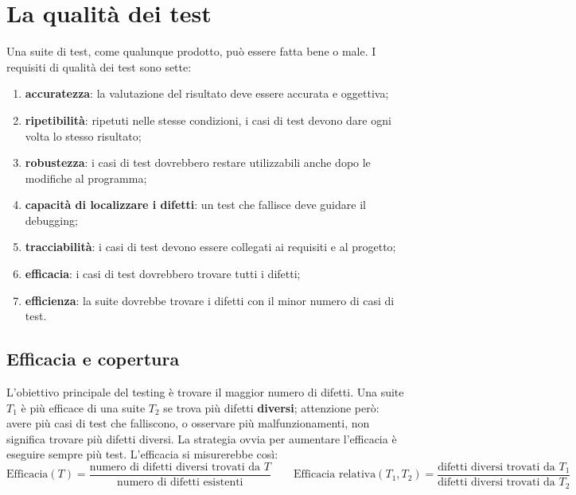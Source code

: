 \section{La qualità dei test}

Una suite di test, come qualunque prodotto, può essere fatta bene o male. I requisiti di qualità dei test sono sette:

\begin{enumerate}
  \item \textbf{accuratezza}: la valutazione del risultato deve essere accurata e oggettiva;
  \item \textbf{ripetibilità}: ripetuti nelle stesse condizioni, i casi di test devono dare ogni volta lo stesso
        risultato;
  \item \textbf{robustezza}: i casi di test dovrebbero restare utilizzabili anche dopo le modifiche al programma;
  \item \textbf{capacità di localizzare i difetti}: un test che fallisce deve guidare il debugging;
  \item \textbf{tracciabilità}: i casi di test devono essere collegati ai requisiti e al progetto;
  \item \textbf{efficacia}: i casi di test dovrebbero trovare tutti i difetti;
  \item \textbf{efficienza}: la suite dovrebbe trovare i difetti con il minor numero di casi di test.
\end{enumerate}

\subsection{Efficacia e copertura}

L'obiettivo principale del testing è trovare il maggior numero di difetti. Una suite \(T_1\) è più efficace di una suite
\(T_2\) se trova più difetti \textbf{diversi}; attenzione però: avere più casi di test che falliscono, o osservare più
malfunzionamenti, non significa trovare più difetti diversi. La strategia ovvia per aumentare l'efficacia è eseguire
sempre più test. L'efficacia si misurerebbe così:
\[
  \text{Efficacia}(T) = \frac{\text{numero di difetti diversi trovati da } T}{\text{numero di difetti esistenti}}
  \qquad
  \text{Efficacia relativa}(T_1, T_2) = \frac{\text{difetti diversi trovati da } T_1}{\text{difetti diversi trovati da }
  T_2}
\]

